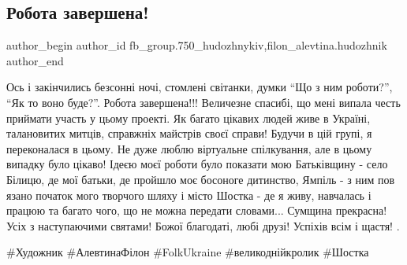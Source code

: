  
 
 
 
 

\subsection{Робота завершена!}
\label{sec:04_04_2018.fb.fb_group.750_hudozhnykiv.3.robota_zavershena_krolik_jampil_bilycja_shostka}
 
\ifcmt
 author_begin
   author_id fb_group.750_hudozhnykiv,filon_alevtina.hudozhnik
 author_end
\fi

Ось і закінчились безсонні ночі, стомлені світанки, думки \enquote{Що з ним роботи?},
\enquote{Як то воно буде?}. Робота завершена!!! Величезне спасибі, що мені випала честь
приймати участь у цьому проекті. Як багато цікавих людей живе в Україні,
талановитих митців, справжніх майстрів своєї справи! Будучи в цій групі, я
переконалася в цьому. Не дуже люблю віртуальне спілкування, але в цьому випадку
було цікаво! Ідеєю моєї роботи було показати мою Батьківщину - село Білицю, де
мої батьки, де пройшло моє босоноге  дитинство, Ямпіль - з ним пов язано початок
мого творчого шляху і місто Шостка - де я живу, навчалась і працюю та багато
чого, що не можна передати словами... Сумщина прекрасна! Усіх з наступаючими
святами! Божої благодаті, любі друзі! Успіхів всім і щастя! . 

\#Художник \#АлевтинаФілон \#FolkUkraine \#великоднійкролик \#Шостка
